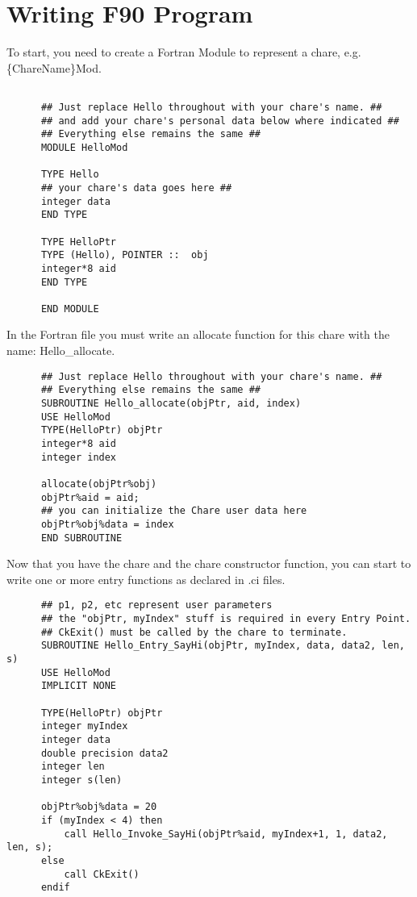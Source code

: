 \documentclass[11pt]{article}
\begin{document}
\section{Writing F90 Program}
To start, you need to create a Fortran Module to represent a chare,
e.g. \{ChareName\}Mod.

\begin{verbatim}

      ## Just replace Hello throughout with your chare's name. ##
      ## and add your chare's personal data below where indicated ##
      ## Everything else remains the same ##
      MODULE HelloMod

      TYPE Hello
      ## your chare's data goes here ##
      integer data
      END TYPE

      TYPE HelloPtr
      TYPE (Hello), POINTER ::  obj
      integer*8 aid
      END TYPE

      END MODULE
\end{verbatim}

In the Fortran file you must write an allocate function for this chare
with the name: Hello\_allocate.

\begin{verbatim}
      ## Just replace Hello throughout with your chare's name. ##
      ## Everything else remains the same ##
      SUBROUTINE Hello_allocate(objPtr, aid, index)
      USE HelloMod
      TYPE(HelloPtr) objPtr 
      integer*8 aid
      integer index

      allocate(objPtr%obj)
      objPtr%aid = aid;
      ## you can initialize the Chare user data here
      objPtr%obj%data = index
      END SUBROUTINE
\end{verbatim}

Now that you have the chare and the chare constructor function, you can start
 to write one or more entry functions as declared in .ci files.
\begin{verbatim}
      ## p1, p2, etc represent user parameters
      ## the "objPtr, myIndex" stuff is required in every Entry Point.
      ## CkExit() must be called by the chare to terminate.
      SUBROUTINE Hello_Entry_SayHi(objPtr, myIndex, data, data2, len, s)
      USE HelloMod
      IMPLICIT NONE

      TYPE(HelloPtr) objPtr
      integer myIndex
      integer data
      double precision data2
      integer len
      integer s(len)

      objPtr%obj%data = 20
      if (myIndex < 4) then
          call Hello_Invoke_SayHi(objPtr%aid, myIndex+1, 1, data2, len, s);
      else 
          call CkExit()
      endif
\end{verbatim}
\end{document}
